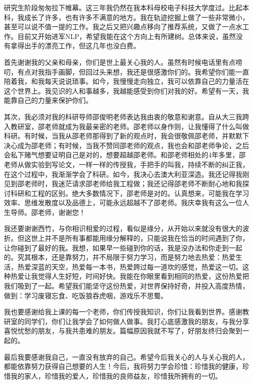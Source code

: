 

\indent
研究生阶段匆匆拉下帷幕。这三年我仍然在我本科母校电子科技大学度过。比起本科，我成长了许多，也有许多不满意的地方。我在轨迹挖掘上做了一些非常微小，甚至可以说不值一提的工作。我之后又把兴趣点移向了推荐系统，又做了一点水工作。目前又开始进军NLP，希望我能在这个方向上有所建树。总体来说，虽然没有拿得出手的漂亮工作，但这几年也没白费。

首先谢谢我的父亲和母亲，你们是世上最关心我的人。虽然有时候电话里有点唠叨，有点对我指手画脚，但回过头来想，我还是很感激你们的。我希望你们能一直陪着我，和我每天说说琐事。如今，我慢慢走向独立，我可以依靠自己的力量活在这个世界上。我见识的人和事越多，我越能感受到你们对我的好。希望有一天，我能靠自己的力量来保护你们。

其次，我必须对我的科研导师邵俊明老师表达我由衷的敬意和谢意。自从大三我跨入教研室，邵老师就成为我最亲密的老师。邵老师以身作则，让我懂得了什么叫做科研。有时候，当我从邵老师那得到了新的观点时，我会很敬佩邵老师，并默默下决心成为邵老师；有时候，当我不赞同邵老师的观点，我也会和邵老师争论，之后会私下赌气想要证明自己是对的，想要超越邵老师。和邵老师相处的4年多里，邵老师从做实验到写论文，一样一样的传授我，手把手的叫我，持续不断的纠正我，在这个过程中，我渐渐学会了科研。如今，我决心去澳大利亚深造。我还记得我刚见到邵老师时，我迷茫请求邵老师给我工程做；我还记得邵老师不断耐心地和我探讨科研和工程的区别。绝大多数情况下，邵老师是对的。认真想来，可能我在学习效率、思维发散度以及品德上，可能永远超越不了邵老师。我庆幸我有这么一位人生导师。邵老师，谢谢您！

我还要谢谢西竹，与你相识相爱的过程，看似是缘分，从开始以来就没有很大的波折。但这世上并不是所有事都能用缘分解释的，只能说我在恰当的时间遇到了你，让你碰到了最好的我。我想，如果早一些碰到你的话，我是没办法和你走到一起的。究其根本，还是靠努力，并不局限于努力学习，而是努力地去热爱：热爱生活，热爱深蓝的天空，热爱每一本书，热爱跨过每一道坎的感觉，热爱这一切。这种热爱让我觉得人生好短，时间好快。我能在你眼里看到相同的热爱，这份热爱把我们吸到了一起。希望我们能坚守这份热爱，对世界保持好奇，并投入高度热情，做到：学习废寝忘食、吃饭狼吞虎咽，游戏乐不思蜀。

我也要感谢给我上课的每一个老师，你们传授我知识，你们让我看到世界。感谢教研室的同学们，你们让我学会了如何做人做事。我打心底感激我的朋友，与我分享喜悦忧愁的朋友，与我共患难的朋友。篇幅原因我就不写了，好朋友终归会聚到一起的。

最后我要感谢我自己，一直没有放弃的自己。希望今后我关心的人与关心我的人，都能依靠努力获得自己想要的人生！今后，我将努力学会珍惜：珍惜我的健康，珍惜我的家人，珍惜我的爱人，珍惜我的良师益友，珍惜我所拥有的一切。


